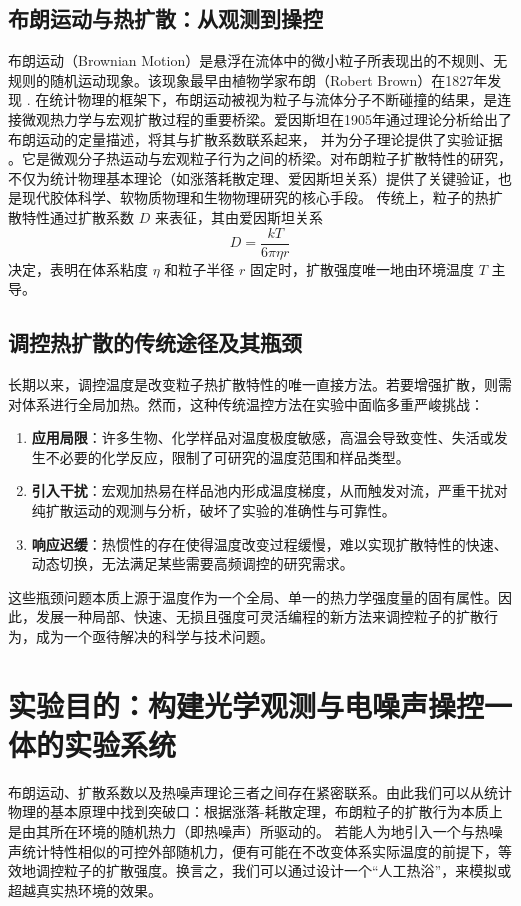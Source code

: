 \documentclass[a4paper]{report} %
\begin{document}
\subsection{布朗运动与热扩散：从观测到操控}
布朗运动（Brownian Motion）是悬浮在流体中的微小粒子所表现出的不规则、无规则的随机运动现象。该现象最早由植物学家布朗（Robert Brown）在1827年发现 \cite{brown1828}. 
在统计物理的框架下，布朗运动被视为粒子与流体分子不断碰撞的结果，是连接微观热力学与宏观扩散过程的重要桥梁。爱因斯坦在1905年通过理论分析给出了布朗运动的定量描述，将其与扩散系数联系起来，
并为分子理论提供了实验证据 \cite{einstein1905}。它是微观分子热运动与宏观粒子行为之间的桥梁。对布朗粒子扩散特性的研究，不仅为统计物理基本理论（如涨落耗散定理、爱因斯坦关系）提供了关键验证，也是现代胶体科学、软物质物理和生物物理研究的核心手段。
传统上，粒子的热扩散特性通过扩散系数 $D$ 来表征，其由爱因斯坦关系
\[
D = \frac{kT}{6\pi \eta r}
\]
决定，表明在体系粘度 $\eta$ 和粒子半径 $r$ 固定时，扩散强度唯一地由环境温度 $T$ 主导。

\subsection{调控热扩散的传统途径及其瓶颈}
长期以来，调控温度是改变粒子热扩散特性的唯一直接方法。若要增强扩散，则需对体系进行全局加热。然而，这种传统温控方法在实验中面临多重严峻挑战：

\begin{enumerate}
  \item \textbf{应用局限}：许多生物、化学样品对温度极度敏感，高温会导致变性、失活或发生不必要的化学反应，限制了可研究的温度范围和样品类型。
  \item \textbf{引入干扰}：宏观加热易在样品池内形成温度梯度，从而触发对流，严重干扰对纯扩散运动的观测与分析，破坏了实验的准确性与可靠性。
  \item \textbf{响应迟缓}：热惯性的存在使得温度改变过程缓慢，难以实现扩散特性的快速、动态切换，无法满足某些需要高频调控的研究需求。
\end{enumerate}

这些瓶颈问题本质上源于温度作为一个全局、单一的热力学强度量的固有属性。因此，发展一种局部、快速、无损且强度可灵活编程的新方法来调控粒子的扩散行为，成为一个亟待解决的科学与技术问题。

\section{实验目的：构建光学观测与电噪声操控一体的实验系统}
布朗运动、扩散系数以及热噪声理论三者之间存在紧密联系。由此我们可以从统计物理的基本原理中找到突破口：根据涨落-耗散定理，布朗粒子的扩散行为本质上是由其所在环境的随机热力（即热噪声）所驱动的。
若能人为地引入一个与热噪声统计特性相似的可控外部随机力，便有可能在不改变体系实际温度的前提下，等效地调控粒子的扩散强度。换言之，我们可以通过设计一个“人工热浴”，来模拟或超越真实热环境的效果。
\end{document}
